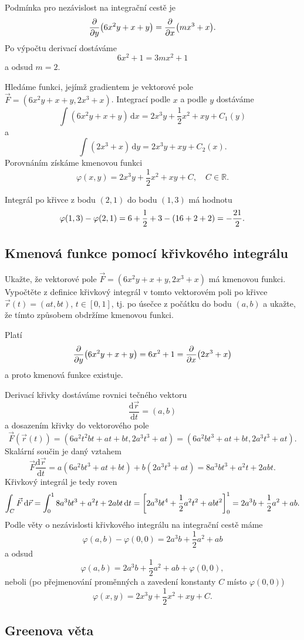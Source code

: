 \reseni

Podmínka pro nezávislost na integrační cestě je $$\pdv{y}\qty(6x^2y+x+y)=\pdv{x}\qty(mx^3+x).$$
Po výpočtu derivací dostáváme
$$6x^2+1=3mx^2+1$$
a odsud $m=2$.

Hledáme funkci, jejímž gradientem je vektorové pole $\vec F=(6x^2y+x+y,2x^3+x)$. 
Integrací podle $x$ a podle $y$ dostáváme
$$\int (6x^2y+x+y)\,\mathrm dx= 2x^3y+\frac 12 x^2+xy+C_1(y) $$
a
$$\int (2x^3+x)\,\mathrm dy=2x^3y+xy+C_2(x).$$
Porovnáním získáme kmenovou funkci
$$\varphi(x,y)=2x^3y+\frac 12 x^2+xy+C,
\quad C
\in
\mathbb R.$$

Integrál po křivce  z bodu $(2,1)$ do bodu $(1,3)$
má hodnotu
$$\varphi(1,3)-\varphi(2,1)=6+\frac 12 +3-\qty(16+2+2)=-\frac{21}2.$$

\konec


\subsection{Kmenová funkce pomocí křivkového integrálu}

Ukažte, že vektorové pole
$\vec F=(6x^2y+x+y,2x^3+x)$ má kmenovou funkci. Vypočtěte z definice křivkový integrál v tomto vektorovém poli po křivce $\vec r(t)=(at,bt)$, $t\in[0,1]$, tj. po úsečce z počátku do bodu $(a,b)$ a ukažte, že tímto způsobem obdržíme kmenovou funkci.  

\reseni
Platí $$\pdv{y}\qty(6x^2y+x+y)=6x^2+1=\pdv{x}\qty(2x^3+x)$$
a proto kmenová funkce existuje.

Derivací křivky dostáváme rovnici tečného vektoru
$$\frac{\mathrm d\vec r}{\mathrm dt}=(a,b)$$
a dosazením křivky do vektorového pole
$$\vec F(\vec r(t))=(6a^2t^2bt+at+bt,2a^3t^3+at)=(6a^2bt^3+at+bt,2a^3t^3+at).$$
Skalární součin je daný vztahem
$$\vec F\frac{\mathrm d\vec r}{\mathrm dt}=a(6a^2bt^3+at+bt)+b(2a^3t^3+at)
=8a^3b t^3+a^2t+2abt.
$$
Křivkový integrál je tedy roven
$$\int_C \vec F\,\mathrm d\vec r=
\int_0^1 8a^3b t^3+a^2t+2abt\,\mathrm dt=
\qty[2a^3bt^4+\frac 12 a^2 t^2+abt^2]_0^1=2a^3b+\frac 12 a^2+ab.
$$
Podle věty o nezávislosti křivkového integrálu na integrační cestě máme
$$\varphi(a,b)-\varphi(0,0)=2a^3b+\frac 12 a^2+ab$$
a odsud
$$\varphi(a,b)=2a^3b+\frac 12 a^2+ab+\varphi(0,0),$$
neboli (po přejmenování proměnných a zavedení konstanty $C$ místo $\varphi(0,0)$)
$$\varphi(x,y)=2x^3y+\frac 12 x^2+xy+C.$$

\konec

\subsection{Greenova věta}

